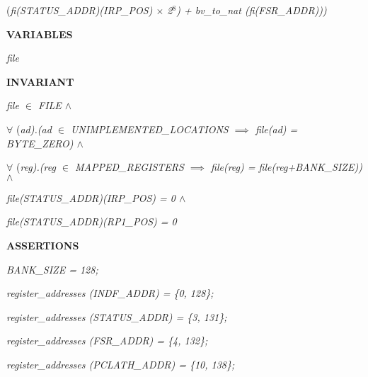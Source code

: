 \begin{sloppypar}
\hspace*{0.60in}\rm (\it fi\rm (\it STATUS\_ADDR\rm )\rm (\it IRP\_POS\rm ) $\times$ \rm 2$^{8}$\rm ) \rm + \it bv\_to\_nat \rm (\it fi\rm (\it FSR\_ADDR\rm )\rm )\rm )

\vspace*{4mm}
\bf VARIABLES

\hspace*{0.20in}\it file

\vspace*{4mm}
\bf INVARIANT

\hspace*{0.20in}\it file  $\in$  \it FILE  $\land$ 

\hspace*{0.20in} $\forall$ \rm (\it ad\rm )\rm .\rm (\it ad  $\in$  \it UNIMPLEMENTED\_LOCATIONS  $\implies$  \it file\rm (\it ad\rm ) \rm = \it BYTE\_ZERO\rm )  $\land$ 

\hspace*{0.20in} $\forall$ \rm (\it reg\rm )\rm .\rm (\it reg  $\in$  \it MAPPED\_REGISTERS  $\implies$  \it file\rm (\it reg\rm ) \rm = \it file\rm (\it reg\rm +\it BANK\_SIZE\rm )\rm )  $\land$ 

\hspace*{0.20in}\it file\rm (\it STATUS\_ADDR\rm )\rm (\it IRP\_POS\rm ) \rm = \rm 0  $\land$ 

\hspace*{0.20in}\it file\rm (\it STATUS\_ADDR\rm )\rm (\it RP1\_POS\rm ) \rm = \rm 0

\vspace*{4mm}
\bf ASSERTIONS

\hspace*{0.20in}\it BANK\_SIZE \rm = \rm 1\rm 2\rm 8\rm ;

\hspace*{0.20in}\it register\_addresses \rm (\it INDF\_ADDR\rm ) \rm = \rm \{\rm 0\rm , \rm 1\rm 2\rm 8\rm \}\rm ;

\hspace*{0.20in}\it register\_addresses \rm (\it STATUS\_ADDR\rm ) \rm = \rm \{\rm 3\rm , \rm 1\rm 3\rm 1\rm \}\rm ;

\hspace*{0.20in}\it register\_addresses \rm (\it FSR\_ADDR\rm ) \rm = \rm \{\rm 4\rm , \rm 1\rm 3\rm 2\rm \}\rm ;

\hspace*{0.20in}\it register\_addresses \rm (\it PCLATH\_ADDR\rm ) \rm = \rm \{\rm 1\rm 0\rm , \rm 1\rm 3\rm 8\rm \}\rm ;


\end{sloppypar}
